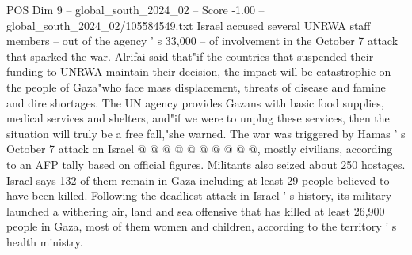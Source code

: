 \begin{textsample}{POS Dim 9 – global\_south\_2024\_02 – Score -1.00 – global\_south\_2024\_02/105584549.txt}
Israel accused several UNRWA staff members -- out of the agency ' s 33,000 -- of involvement in the October 7 attack that sparked the war.
Alrifai said that"if the countries that suspended their funding to UNRWA maintain their decision, the impact will be catastrophic on the people of Gaza"who face mass displacement, threats of disease and famine and dire shortages.
The UN agency provides Gazans with basic food supplies, medical services and shelters, and"if we were to unplug these services, then the situation will truly be a free fall,"she warned.
The war was triggered by Hamas ' s October 7 attack on Israel @ @ @ @ @ @ @ @ @ @, mostly civilians, according to an AFP tally based on official figures.
Militants also seized about 250 hostages.
Israel says 132 of them remain in Gaza including at least 29 people believed to have been killed.
Following the deadliest attack in Israel ' s history, its military launched a withering air, land and sea offensive that has killed at least 26,900 people in Gaza, most of them women and children, according to the territory ' s health ministry.

\end{textsample}
